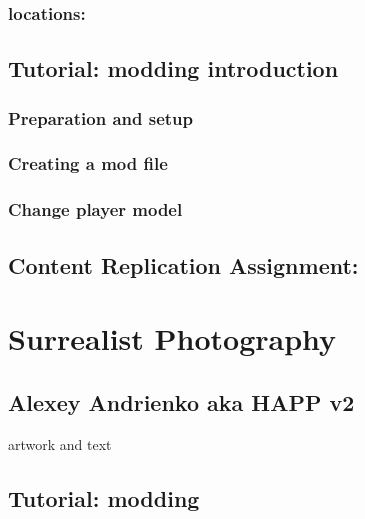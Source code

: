 \documentclass[
  openany]{book}
\begin{document}
\hypertarget{locations-2}{%
\subsection{locations:}\label{locations-2}}

\hypertarget{tutorial-modding-introduction}{%
\section{Tutorial: modding introduction}\label{tutorial-modding-introduction}}

\hypertarget{preparation-and-setup}{%
\subsection{Preparation and setup}\label{preparation-and-setup}}

\hypertarget{creating-a-mod-file}{%
\subsection{Creating a mod file}\label{creating-a-mod-file}}

\hypertarget{change-player-model}{%
\subsection{Change player model}\label{change-player-model}}

\hypertarget{content-replication-assignment-3}{%
\section{Content Replication Assignment:}\label{content-replication-assignment-3}}

\hypertarget{surrealist-photography}{%
\chapter{Surrealist Photography}\label{surrealist-photography}}

\hypertarget{alexey-andrienko-aka-happ-v2}{%
\section{Alexey Andrienko aka HAPP v2}\label{alexey-andrienko-aka-happ-v2}}

artwork and text

\hypertarget{tutorial-modding}{%
\section{Tutorial: modding}\label{tutorial-modding}}
\end{document}
